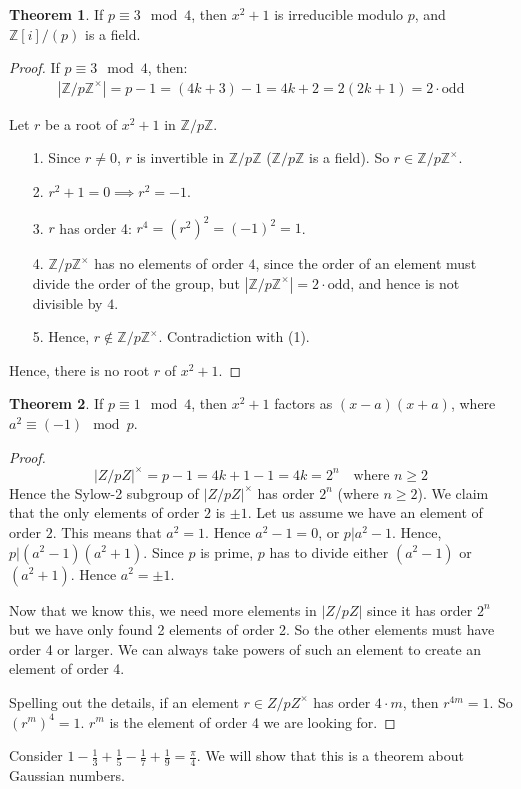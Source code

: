 \documentclass{book}
\newcommand{\Z}{\ensuremath{\mathbb{Z}}}
\theoremstyle{definition}
\newtheorem{theorem}{Theorem}
\begin{document}
\begin{theorem}
If $p \equiv 3 \mod 4$, then $x^2+1$ is irreducible modulo $p$,
and $\Z[i]/(p)$ is a field.
\end{theorem}
\begin{proof}
If $p \equiv 3 \mod 4$, then:
\begin{align*}
|\Z/p\Z^\times| = p - 1 = (4k + 3) - 1 = 4k + 2 = 2(2k + 1) = 2 \cdot \text{odd}
\end{align*}

Let $r$ be a root of $x^2 + 1$ in $\Z/p\Z$. 
\begin{itemize}
\item[1.] Since $r \neq 0$, $r$ is invertible in $\Z/p\Z$ ($\Z/p\Z$ is a field). So $r \in \Z/p\Z^\times$.
\item[2.] $r^2 + 1 = 0 \implies r^2 = -1$.
\item[3.] $r$ has order 4: $r^4 = (r^2)^2 = (-1)^2 = 1$.
\item[4.] $\Z/p\Z^\times$ has no elements of order $4$, since the order of an element
 must divide the order of the group, but $|\Z/p\Z^\times| = 2\cdot \text{odd}$,
 and hence is not divisible by $4$.
\item[5.] Hence, $r \not \in \Z/p\Z^\times$. Contradiction with (1).
\end{itemize}
Hence, there is no root $r$ of $x^2 + 1$.
\end{proof}

\begin{theorem}
    If $p \equiv 1 \mod 4$, then $x^2+1$ factors as $(x-a)(x+a)$, where
    $a^2 \equiv (-1) \mod p$.
\end{theorem}
\begin{proof}
    $$|Z/pZ|^\times = p - 1 = 4k + 1 - 1 = 4k = 2^n \quad \text{where $n \geq 2$}$$
    Hence the Sylow-2 subgroup of $|Z/pZ|^\times$ has order $2^n$ (where $n \geq 2$).
    We claim that the only elements of order $2$ is $\pm 1$. Let us assume
    we have an element of order $2$. This means that $a^2 = 1$. Hence $a^2 - 1 = 0$,
    or $p | a^2 - 1$. Hence, $p | (a^2 - 1) (a^2 + 1)$. Since $p$ is prime,
    $p$ has to divide either $(a^2 - 1)$ or $(a^2+1)$. Hence $a^2 = \pm 1$.

    Now that we know this, we need more elements in $|Z/pZ|$ since it has order $2^n$
    but we have only found 2 elements of order 2. So the other elements
    must have order 4 or larger. We can always take powers of such an element
    to create an element of order 4.

    Spelling out the details, if an element $r \in Z/pZ^\times$ has order
    $4 \cdot m$, then $r^{4m} = 1$. So $(r^m)^4 = 1$. $r^m$ is the element
    of order 4 we are looking for.
\end{proof}

Consider $1 - \frac{1}{3} + \frac{1}{5} - \frac{1}{7} + \frac{1}{9} = \frac{\pi}{4}$.
We will show that this is a theorem about Gaussian numbers.


\end{document}
